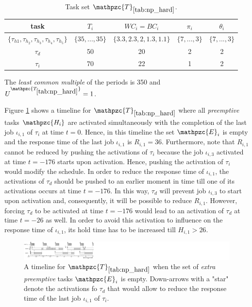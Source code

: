 \documentclass[fleqn]{article}
\begin{document}
\begin{table}[H]
	\center
	\caption{Task set $\mathpzc{T}_{\ref{tab:np_hard}}$.}
	\label{tab:np_hard}
	\begin{tabular}{c c c c c}
		\hline 
		task & $T_i$ & $WC_i=BC_i$ & $\pi_i$ & $\theta_i$ \\ 
		\hline 
		$\{ \tau_{h1},\tau_{h_2},\tau_{h_3},\tau_{h_4},\tau_{h_5} \}$& $\{35,...,35\}$  & $\{3.3,2.3,2,1.3,1.1\}$  & $\{7,...,3\}$ & $\{7,...,3\}$ \\ 
		$\tau_d$& 50 & 20 & 2 & 2 \\ 
		$\tau_i$& 70 & 22 & 1 & 2 \\
		\hline 
	\end{tabular}
	\small
	\item The \textit{least common multiple} of the periods is 350 and $U^{\mathpzc{T_{\ref{tab:np_hard}}}}=1$.
\end{table}

Figure \ref{fig:np_hard1} shows a timeline for $\mathpzc{T}_{\ref{tab:np_hard}}$ where all \textit{preemptive} tasks $\mathpzc{H_i}$ are activated simultaneously with the completion of the last job $\iota_{i,1}$ of $\tau_i$ at time $t=0$. Hence, in this timeline the set $\mathpzc{E}_i$ is empty and the response time of the last job $\iota_{i,1}$ is $R_{i,1}=36$. Furthermore, note that $R_{i,1}$ cannot be reduced by pushing the activations of $\tau_i$ because  the job $\iota_{i,3}$ activated at time $t=-176$ starts upon activation. Hence, pushing the activation of $\tau_i$ would modify the schedule. In order to reduce the response time of $\iota_{i,1}$, the activations of $\tau_d$ should be pushed to an earlier moment in time till one of its activations occurs at time $t=-176$. In this way, $\tau_d$ will prevent job $\iota_{i,3}$ to start upon activation and, consequently, it will be possible to reduce $R_{i,1}$. However, forcing $\tau_d$ to be activated at time $t=-176$ would lead to an activation of $\tau_d$ at time $t=-26$ as well. In order to avoid this activation to influence on the response time of $\iota_{i,1}$, its hold time has to be increased till $H_{i,1} > 26$.

\begin{figure}[H]
	\centering
	\includegraphics[width=1\linewidth]{figures/multiple_tasks}
	\caption{A timeline for $\mathpzc{T}_{\ref{tab:np_hard}}$ when the set of \textit{extra preemptive} tasks $\mathpzc{E}_i$ is empty. Down-arrows with a "star" denote the activations fo $\tau_d$ that would allow to reduce the response time of the last job $\iota_{i,1}$ of $\tau_i$.}
	\label{fig:np_hard1}
\end{figure}
\end{document}
